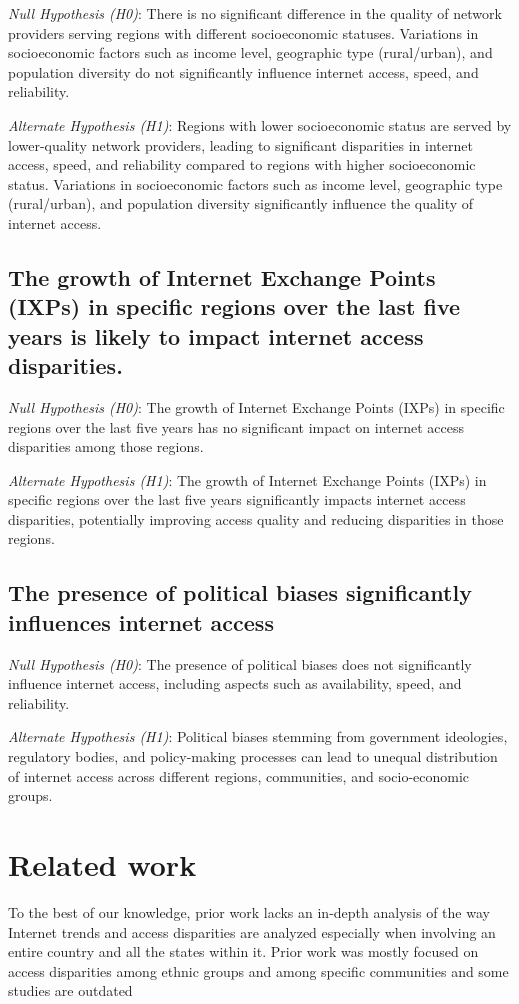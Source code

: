 \documentclass[conference]{IEEEtran}
\begin{document}
\textit{Null Hypothesis (H0)}: There is no significant difference in the quality of network providers serving regions with different socioeconomic statuses. Variations in socioeconomic factors such as income level, geographic type (rural/urban), and population diversity do not significantly influence internet access, speed, and reliability.

\textit{Alternate Hypothesis (H1)}: Regions with lower socioeconomic status are served by lower-quality network providers, leading to significant disparities in internet access, speed, and reliability compared to regions with higher socioeconomic status. Variations in socioeconomic factors such as income level, geographic type (rural/urban), and population diversity significantly influence the quality of internet access.

\subsection{\textbf{The growth of Internet Exchange Points (IXPs) in specific regions over the last five years is likely to impact internet access disparities.}}

\textit{Null Hypothesis (H0)}: The growth of Internet Exchange Points (IXPs) in specific regions over the last five years has no significant impact on internet access disparities among those regions.

\textit{Alternate Hypothesis (H1)}: The growth of Internet Exchange Points (IXPs) in specific regions over the last five years significantly impacts internet access disparities, potentially improving access quality and reducing disparities in those regions.

\subsection{\textbf{The presence of political biases significantly influences internet access}}
\textit{Null Hypothesis (H0)}: The presence of political biases does not significantly influence internet access, including aspects such as availability, speed, and reliability.

\textit{Alternate Hypothesis (H1)}: Political biases stemming from government ideologies, regulatory bodies, and policy-making processes can lead to unequal distribution of internet access across different regions, communities, and socio-economic groups.

\section{Related work}
To the best of our knowledge, prior work lacks an in-depth analysis of the way Internet trends and access disparities are analyzed especially when involving an entire country and all the states within it. Prior work was mostly focused on access disparities among ethnic groups and among specific communities and some studies are outdated \cite{1}
\end{document}
